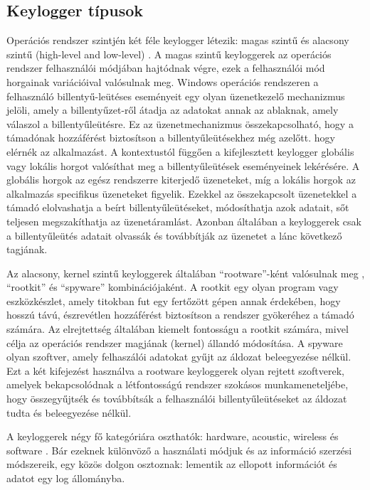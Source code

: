 \documentclass[a4paper, 11pt]{article}
\begin{document}
\subsection{Keylogger típusok}
Operációs rendszer szintjén két féle keylogger létezik: magas szintű és alacsony szintű (high-level and low-level) \cite{wood2010keyloggers}. A magas szintű keyloggerek az operációs rendszer felhasználói módjában hajtódnak végre, ezek a felhasználói mód horgainak variációival valósulnak meg. Windows operációs rendszeren a felhasználó billentyű-leütéses eseményeit egy olyan üzenetkezelő mechanizmus jelöli, amely a billentyűzet-ről átadja az adatokat annak az ablaknak, amely válaszol a billentyűleütésre. Ez az üzenetmechanizmus összekapcsolható, hogy a támadónak hozzáférést biztosítson a billentyűleütésekhez még azelőtt. hogy elérnék az alkalmazást. A kontextustól függően a kifejlesztett keylogger globális vagy lokális horgot valósíthat meg a billentyűleütések eseményeinek lekérésére. A globális horgok az egész rendszerre kiterjedő üzeneteket, míg a lokális horgok az alkalmazás specifikus üzeneteket figyelik. Ezekkel az összekapcsolt üzenetekkel a támadó elolvashatja a beírt billentyűleütéseket, módosíthatja azok adatait, sőt teljesen megszakíthatja az üzenetáramlást. Azonban általában a keyloggerek csak a billentyűleütés adatait olvassák és továbbítják az üzenetet a lánc következő tagjának.

Az alacsony, kernel szintű keyloggerek általában ``rootware''-ként valósulnak meg \cite{butler2006r2}, ``rootkit'' és ``spyware'' kombinációjaként. A rootkit egy olyan program vagy eszközkészlet, amely titokban fut egy fertőzött gépen annak érdekében, hogy hosszú távú, észrevétlen hozzáférést biztosítson a rendszer gyökeréhez a támadó számára. Az elrejtettség általában kiemelt fontosságu a rootkit számára, mivel célja az operációs rendszer magjának (kernel) állandó módosítása. A spyware olyan szoftver, amely felhaszálói adatokat gyűjt az áldozat beleegyezése nélkül. Ezt a két kifejezést használva a rootware keyloggerek olyan rejtett szoftverek, amelyek bekapcsolódnak a létfontosságú rendszer szokásos munkameneteljébe, hogy összegyűjtsék és továbbítsák a felhasználói billentyűleütéseket az áldozat tudta és beleegyezése nélkül.

A keyloggerek négy fő kategóriára oszthatók: hardware, acoustic, wireless és software \cite{ahmed2014survey}. Bár ezeknek különvöző a használati módjuk és az információ szerzési módszereik, egy közös dolgon osztoznak: lementik az ellopott információt és adatot egy log állományba.
\end{document}
